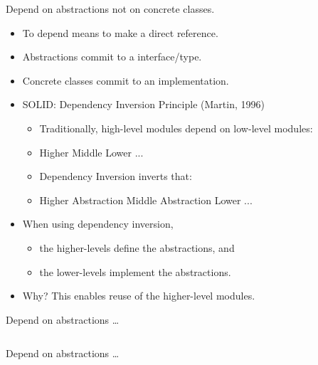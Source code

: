 \documentclass{beamer}
\begin{document}
\begin{frame}{Depend on abstractions not on concrete classes.}
    \begin{itemize}
        \item To depend means to make a direct reference.
        \item Abstractions commit to a interface/type.
        \item Concrete classes commit to an implementation.
        \item SOLID: Dependency Inversion Principle (Martin, 1996)
        \begin{itemize}
            \item Traditionally, high-level modules depend on low-level modules:
            \item Higher \textrightarrow{} Middle \textrightarrow{} Lower \textrightarrow{} ...
            \item Dependency Inversion inverts that:
            \item Higher \textrightarrow{} Abstraction \textleftarrow{} Middle \textrightarrow{} Abstraction \textleftarrow{} Lower ...
        \end{itemize}
        \item When using dependency inversion, 
        \begin{itemize}
            \item the higher-levels define the abstractions, and
            \item the lower-levels implement the abstractions.
        \end{itemize}
        \item Why? This enables reuse of the higher-level modules.
    \end{itemize}
\end{frame}

\begin{frame}{Depend on abstractions \ldots}
    \vspace{0cm}
    \begin{columns}
        \column{\dimexpr\paperwidth-40pt}
        
    \end{columns}
\end{frame}

\begin{frame}{Depend on abstractions \ldots}
    \vspace{0cm}
    \begin{columns}
        \column{\dimexpr\paperwidth-40pt}
        
    \end{columns}
\end{frame}
\end{document}
